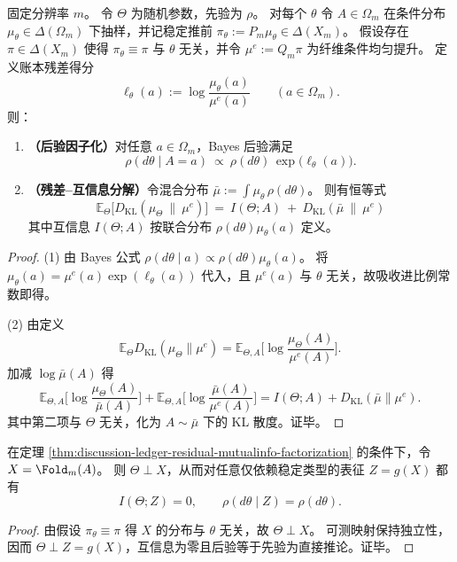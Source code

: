 \begin{theorem}\label{thm:discussion-ledger-residual-mutualinfo-factorization}
固定分辨率 \(m\)。
令 \(\Theta\) 为随机参数，先验为 \(\rho\)。
对每个 \(\theta\) 令 \(A\in\Omega_m\) 在条件分布 \(\mu_\theta\in\Delta(\Omega_m)\) 下抽样，并记稳定推前 \(\pi_\theta:=P_m\mu_\theta\in\Delta(X_m)\)。
假设存在 \(\pi\in\Delta(X_m)\) 使得 \(\pi_\theta\equiv \pi\) 与 \(\theta\) 无关，并令 \(\mu^e:=Q_m\pi\) 为纤维条件均匀提升。
定义账本残差得分
\[
\ell_\theta(a):=\log\frac{\mu_\theta(a)}{\mu^e(a)}\qquad(a\in\Omega_m).
\]
则：
\begin{enumerate}
  \item \textbf{（后验因子化）}对任意 \(a\in\Omega_m\)，Bayes 后验满足
  \[
  \rho(d\theta\mid A=a)\ \propto\ \rho(d\theta)\,\exp\!\bigl(\ell_\theta(a)\bigr).
  \]
  \item \textbf{（残差--互信息分解）}令混合分布 \(\bar\mu:=\int \mu_\theta\,\rho(d\theta)\)。
  则有恒等式
  \[
  \boxed{\;
  \mathbb{E}_{\Theta}\bigl[D_{\mathrm{KL}}(\mu_\Theta\ \|\ \mu^e)\bigr]
  \ =\ I(\Theta;A)\ +\ D_{\mathrm{KL}}(\bar\mu\ \|\ \mu^e)\;}
  \]
  其中互信息 \(I(\Theta;A)\) 按联合分布 \(\rho(d\theta)\mu_\theta(a)\) 定义。
\end{enumerate}
\end{theorem}
\begin{proof}
(1) 由 Bayes 公式 \(\rho(d\theta\mid a)\propto \rho(d\theta)\mu_\theta(a)\)。
将 \(\mu_\theta(a)=\mu^e(a)\exp(\ell_\theta(a))\) 代入，且 \(\mu^e(a)\) 与 \(\theta\) 无关，故吸收进比例常数即得。
\par
(2) 由定义
\[
\mathbb{E}_{\Theta}D_{\mathrm{KL}}(\mu_\Theta\|\mu^e)
=\mathbb{E}_{\Theta,A}\Big[\log\frac{\mu_\Theta(A)}{\mu^e(A)}\Big].
\]
加减 \(\log\bar\mu(A)\) 得
\[
\mathbb{E}_{\Theta,A}\Big[\log\frac{\mu_\Theta(A)}{\bar\mu(A)}\Big]
+\mathbb{E}_{\Theta,A}\Big[\log\frac{\bar\mu(A)}{\mu^e(A)}\Big]
=I(\Theta;A)+D_{\mathrm{KL}}(\bar\mu\|\mu^e).
\]
其中第二项与 \(\Theta\) 无关，化为 \(A\sim\bar\mu\) 下的 KL 散度。证毕。
\end{proof}

\begin{corollary}\label{cor:discussion-address-invariant-no-bayes-learning-visible-layer}
在定理 \ref{thm:discussion-ledger-residual-mutualinfo-factorization} 的条件下，令 \(X=\Fold_m(A)\)。
则 \(\Theta\perp X\)，从而对任意仅依赖稳定类型的表征 \(Z=g(X)\) 都有
\[
I(\Theta;Z)=0,\qquad \rho(d\theta\mid Z)=\rho(d\theta).
\]
\end{corollary}
\begin{proof}
由假设 \(\pi_\theta\equiv\pi\) 得 \(X\) 的分布与 \(\theta\) 无关，故 \(\Theta\perp X\)。
可测映射保持独立性，因而 \(\Theta\perp Z=g(X)\)，互信息为零且后验等于先验为直接推论。证毕。
\end{proof}

